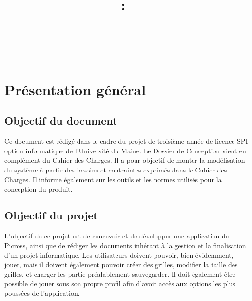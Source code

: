 \documentclass[11pt]{article}
\title{
\pagenumbering{roman} \setcounter{page}{0} %
\vspace{2in}
\textmd{\textbf{\hmwkClass:\ \hmwkTitle}}\\
\normalsize\vspace{0.1in}\small{\hmwkDueDate}\\
\vspace{0.1in}\large{\textit{\hmwkClassInstructor\ }}
\vspace{3in}
}
\author{\textbf{\hmwkAuthorName}}
\date{\hmwkAuthorClasse} %
\begin{document}
\thispagestyle{empty}
\maketitle
\newpage



\thispagestyle{empty}
 \setcounter{page}{0} %
\renewcommand\contentsname{Sommaire}
\tableofcontents
\newpage



\newpage

\section{Présentation général}

\subsection{Objectif du document}

Ce document est rédigé dans le cadre du projet de troisième année de licence SPI option informatique de l'Université du
Maine. Le Dossier de Conception vient en complément du Cahier des Charges. Il a pour objectif de monter la modélisation
du système à partir des besoins et contraintes exprimés dans le Cahier des Charges. Il informe également sur les outils
et les normes utilisés pour la conception du produit.

\subsection{Objectif du projet}

L'objectif de ce projet est de concevoir et de développer une application de Picross, ainsi que de rédiger les documents
inhérant à la gestion et la finalisation d'un projet informatique. Les utilisateurs doivent pouvoir, bien évidemment,
jouer, mais il doivent également pouvoir créer des grilles, modifier la taille des grilles, et charger les partie
préalablement sauvegarder. Il doit également être possible de jouer sous son propre profil afin d'avoir accès aux
options les plus poussées de l'application.
\end{document}
